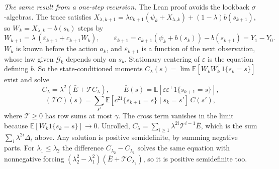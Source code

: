 \documentclass[11pt]{article}
\theoremstyle{definition}
\theoremstyle{remark}
\newcommand{\E}{\mathbb{E}}
\begin{document}
\emph{The same result from a one-step recursion.} The Lean proof avoids the lookback
$\sigma$-algebras. The trace satisfies
$X_{\lambda,k+1} = \lambda c_{k+1}(\psi_k + X_{\lambda,k}) + (1-\lambda)b(s_{k+1})$, so
$W_k = X_{\lambda,k} - b(s_k)$ steps by
\[
  W_{k+1} = \lambda\,(\varepsilon_{k+1} + c_{k+1}W_k),\qquad
  \varepsilon_{k+1} = c_{k+1}(\psi_k + b(s_k)) - b(s_{k+1}) = Y_1 - Y_0 .
\]
$W_k$ is known before the action $a_k$, and $\varepsilon_{k+1}$ is a function of the next observation, whose
law given $\mathcal G_k$ depends only on $s_k$. Stationary centering of $\varepsilon$ is the
equation defining $b$. So the state-conditioned moments $C_\lambda(s) = \lim\E[W_kW_k^\top1\{s_k = s\}]$ exist
and solve
\[
  C_\lambda = \lambda^2(\bar E + \mathcal T C_\lambda),\qquad
  \bar E(s) = \E[\varepsilon\varepsilon^\top1\{s_{k+1} = s\}],
\]
\[
  (\mathcal TC)(s) = \sum_{s'}\E[c^21\{s_{k+1} = s\}\mid s_k = s']\,C(s'),
\]
where $\mathcal T \ge 0$ has row sums at most $\gamma$. The cross term vanishes in the limit because
$\E[W_k1\{s_k = s\}] \to 0$. Unrolled, $C_\lambda = \sum_{i\ge1}\lambda^{2i}\mathcal T^{i-1}\bar E$, which is the
sum $\sum_i\lambda^{2i}\Delta_i$ above. Any solution is positive semidefinite, by summing negative parts. For
$\lambda_1 \le \lambda_2$ the difference $C_{\lambda_2} - C_{\lambda_1}$ solves the same equation with
nonnegative forcing $(\lambda_2^2 - \lambda_1^2)(\bar E + \mathcal TC_{\lambda_2})$, so it is positive
semidefinite too.
\end{document}
